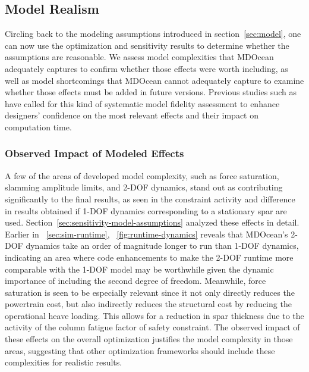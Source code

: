 \subsection{Model Realism}
Circling back to the modeling assumptions introduced in section~\ref{sec:model}, one can now use the optimization and sensitivity results to determine whether the assumptions are reasonable.
We assess model complexities that MDOcean adequately captures to confirm whether those effects were worth including, as well as model shortcomings that MDOcean cannot adequately capture to examine whether those effects must be added in future versions.
Previous studies such as \cite{garcia-teruel_reliability-based_2021} have called for this kind of systematic model fidelity assessment to enhance designers' confidence on the most relevant effects and their impact on computation time.

\subsubsection{Observed Impact of Modeled Effects}
A few of the areas of developed model complexity, such as force saturation, slamming amplitude limits, and 2-DOF dynamics, stand out as contributing significantly to the final results, as seen in the constraint activity and difference in results obtained if 1-DOF dynamics corresponding to a stationary spar are used.
Section~\ref{sec:sensitivity-model-assumptions} analyzed these effects in detail.
Earlier in \sectionautorefname~\ref{sec:sim-runtime}, \figureautorefname~\ref{fig:runtime-dynamics} reveals that MDOcean's 2-DOF dynamics take an order of magnitude longer to run than 1-DOF dynamics, indicating an area where code enhancements to make the 2-DOF runtime more comparable with the 1-DOF model may be worthwhile given the dynamic importance of including the second degree of freedom. 
Meanwhile, force saturation is seen to be especially relevant since it not only directly reduces the powertrain cost, but also indirectly reduces the structural cost by reducing the operational heave loading.
This allows for a reduction in spar thickness due to the activity of the column fatigue factor of safety constraint. 
The observed impact of these effects on the overall optimization justifies the model complexity in those areas, suggesting that other optimization frameworks should include these complexities for realistic results.

